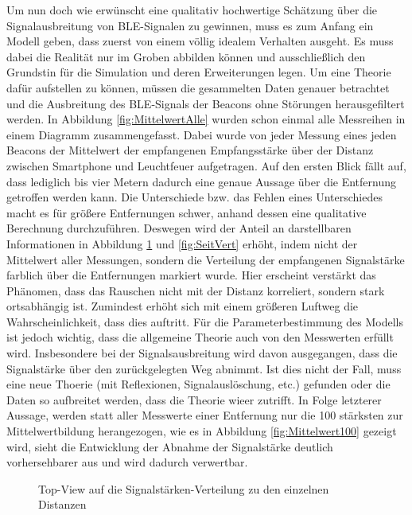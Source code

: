Um nun doch wie erwünscht eine qualitativ hochwertige Schätzung über die Signalausbreitung von BLE-Signalen zu gewinnen, muss es zum Anfang ein Modell geben, dass zuerst von einem völlig idealem Verhalten ausgeht. Es muss dabei die Realität nur im Groben abbilden können und ausschließlich den Grundstin für die Simulation und deren Erweiterungen legen. Um eine Theorie dafür aufstellen zu können, müssen die gesammelten Daten genauer betrachtet und die Ausbreitung des BLE-Signals der Beacons ohne Störungen herausgefiltert werden. In Abbildung \ref{fig:MittelwertAlle} wurden schon einmal alle Messreihen in einem Diagramm zusammengefasst. Dabei wurde von jeder Messung eines jeden Beacons der Mittelwert der empfangenen Empfangsstärke über der Distanz zwischen Smartphone und Leuchtfeuer aufgetragen. Auf den ersten Blick fällt auf, dass lediglich bis vier Metern dadurch eine genaue Aussage über die Entfernung getroffen werden kann. Die Unterschiede bzw. das Fehlen eines Unterschiedes macht es für größere Entfernungen schwer, anhand dessen eine qualitative Berechnung durchzuführen. Deswegen wird der Anteil an darstellbaren Informationen in Abbildung \ref{fig:DraufVert} und \ref{fig:SeitVert} erhöht, indem nicht der Mittelwert aller Messungen, sondern die Verteilung der empfangenen Signalstärke farblich über die Entfernungen markiert wurde. Hier erscheint verstärkt das Phänomen, dass das Rauschen nicht mit der Distanz korreliert, sondern stark ortsabhängig ist. Zumindest erhöht sich mit einem größeren Luftweg die Wahrscheinlichkeit, dass dies auftritt. Für die Parameterbestimmung des Modells ist jedoch wichtig, dass die allgemeine Theorie auch von den Messwerten erfüllt wird. Insbesondere bei der Signalsausbreitung wird davon ausgegangen, dass die Signalstärke über den zurückgelegten Weg abnimmt. Ist dies nicht der Fall, muss eine neue Thoerie (mit Reflexionen, Signalauslöschung, etc.) gefunden oder die Daten so aufbreitet werden, dass die Theorie wieer zutrifft. In Folge letzterer Aussage, werden statt aller Messwerte einer Entfernung nur die 100 stärksten zur Mittelwertbildung herangezogen, wie es in Abbildung \ref{fig:Mittelwert100} gezeigt wird, sieht die Entwicklung der Abnahme der Signalstärke deutlich vorhersehbarer aus und wird dadurch verwertbar. 
\begin{figure}[H] 
\centering
{}
\caption{Top-View auf die Signalstärken-Verteilung zu den einzelnen Distanzen}
\label{fig:DraufVert}
\end{figure}
